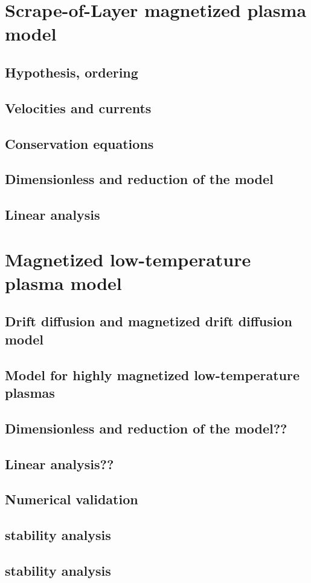 	
	\section{Scrape-of-Layer magnetized plasma model}
		\subsection{Hypothesis, ordering}
		\subsection{Velocities and currents}
		\subsection{Conservation equations}
		\subsection{Dimensionless and reduction of the model}
		\subsection{Linear analysis}
	\section{Magnetized low-temperature plasma model}
		\subsection{Drift diffusion and magnetized drift diffusion model}
		\subsection{Model for highly magnetized low-temperature plasmas}
		\subsection{Dimensionless and reduction of the model??}
		\subsection{Linear analysis??}
		\subsection{Numerical validation}
		\subsection{stability analysis}
		\subsection{stability analysis}
